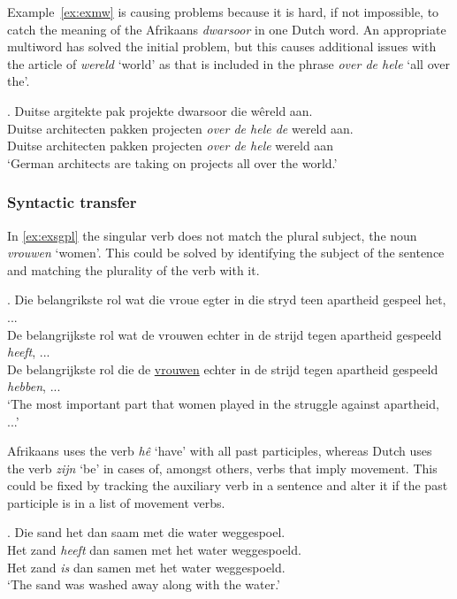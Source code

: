 \documentclass[11pt]{article}
\begin{document}
Example~\ref{ex:exmw} is causing problems because it is hard, if not impossible, to catch the meaning of the 
Afrikaans {\em dwarsoor} in one Dutch word. An appropriate multiword has solved the initial problem, but this 
causes additional issues with the article of {\em wereld} `world' as that is included in the 
phrase {\em over de hele} `all over the'.

\ex. \label{ex:exmw} 
    Duitse argitekte pak projekte dwarsoor die wêreld aan. \\
    Duitse architecten pakken projecten {\em over de hele de} wereld aan. \\
    Duitse architecten pakken projecten {\em over de hele} wereld aan \\
   `German architects are taking on projects all over the world.'

\subsubsection{Syntactic transfer}

In \ref{ex:exsgpl} the singular verb does not match the plural subject, the noun {\em vrouwen} `women'. This 
could be solved by identifying the subject of the sentence and matching the plurality 
of the verb with it.

\ex. \label{ex:exsgpl} 
    Die belangrikste rol wat die vroue egter in die stryd teen apartheid gespeel het, ... \\
    De belangrijkste rol wat de vrouwen echter in de strijd tegen apartheid gespeeld {\em heeft}, ... \\
    De belangrijkste rol die de \underline{vrouwen} echter in de strijd tegen apartheid gespeeld {\em hebben}, ... \\
    `The most important part that women played in the struggle against apartheid, ...' 

Afrikaans uses the verb {\em hê} `have' with all past participles, whereas Dutch uses the 
verb {\em zijn} `be' in cases of, amongst others, verbs that imply movement. This could be fixed 
by tracking the auxiliary verb in a sentence and alter it if the past participle is in a list
of movement verbs.

\ex. \label{ex:exserhaverl} 
    Die sand het dan saam met die water weggespoel. \\
    Het zand {\em heeft} dan samen met het water weggespoeld. \\
    Het zand {\em is} dan samen met het water weggespoeld. \\
   `The sand was washed away along with the water.'
\end{document}
